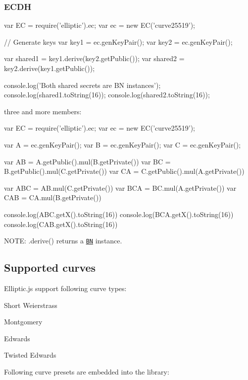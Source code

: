 \subsubsection*{E\+C\+DH}


\begin{DoxyCode}
var EC = require('elliptic').ec;
var ec = new EC('curve25519');

// Generate keys
var key1 = ec.genKeyPair();
var key2 = ec.genKeyPair();

var shared1 = key1.derive(key2.getPublic());
var shared2 = key2.derive(key1.getPublic());

console.log('Both shared secrets are BN instances');
console.log(shared1.toString(16));
console.log(shared2.toString(16));
\end{DoxyCode}


three and more members\+: 
\begin{DoxyCode}
var EC = require('elliptic').ec;
var ec = new EC('curve25519');

var A = ec.genKeyPair();
var B = ec.genKeyPair();
var C = ec.genKeyPair();

var AB = A.getPublic().mul(B.getPrivate())
var BC = B.getPublic().mul(C.getPrivate())
var CA = C.getPublic().mul(A.getPrivate())

var ABC = AB.mul(C.getPrivate())
var BCA = BC.mul(A.getPrivate())
var CAB = CA.mul(B.getPrivate())

console.log(ABC.getX().toString(16))
console.log(BCA.getX().toString(16))
console.log(CAB.getX().toString(16))
\end{DoxyCode}


N\+O\+TE\+: {\ttfamily .derive()} returns a \href{https://github.com/indutny/bn.js}{\tt BN} instance.

\subsection*{Supported curves}

Elliptic.\+js support following curve types\+:


\begin{DoxyItemize}
\item Short Weierstrass
\item Montgomery
\item Edwards
\item Twisted Edwards
\end{DoxyItemize}

Following curve \textquotesingle{}presets\textquotesingle{} are embedded into the library\+:


